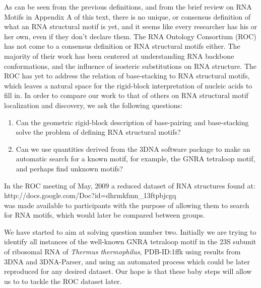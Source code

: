 As can be seen from the previous definitions, and from the brief
review on RNA Motifs in Appendix A of this text, there is no unique,
or consensus definition of what an RNA structural motif is yet, and it
seems like every researcher has his or her own, even if they don't declare
them. The RNA Ontology Consortium (ROC) has not come to a consensus
definition or RNA structural motifs either. The majority of their
work has been centered at understanding RNA backbone conformations, and
the influence of isosteric substitutions on RNA structure. The
ROC has yet to address the relation of base-stacking to RNA structural
motifs, which leaves a natural space for the rigid-block interpretation
of nucleic acids to fill in.
In order to compare our work to that of others on RNA structural motif
localization and discovery, we ask the following questions:
\begin{enumerate}
\item{Can the geometric rigid-block description of base-pairing and
base-stacking solve the problem of defining RNA structural motifs?}
\item{Can we use quantities derived from the 3DNA software package to make
an automatic search for a known motif, for example, the GNRA
tetraloop motif, and perhaps find unknown motifs?}
\end{enumerate}
In the ROC meeting of May, 2009 a reduced dataset of RNA
structures found at:\\
http://docs.google.com/Doc?id=dhrmkfmn\_13ftpbjcgq\\
was made available to participants with the purpose of allowing
them to search for RNA motifs, which would later be compared between groups.

We have started to aim at solving
question number two. Initially we are trying to identify all
instances of the well-known GNRA tetraloop motif in
the 23S subunit of ribosomal RNA of \textit{Thermus thermophilus},
PDB-ID:1ffk using results from 3DNA and 3DNA-Parser, and using an
automated process which could be later reproduced for any desired dataset.
Our hope is that these baby steps will allow us to to tackle the ROC dataset later.

